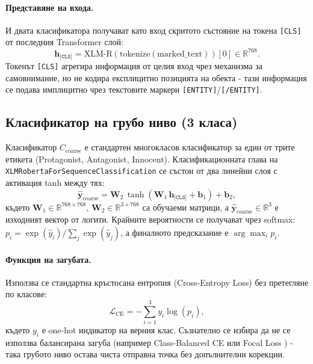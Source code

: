 \documentclass[12pt,a4paper]{report}
\begin{document}
\paragraph{Представяне на входа.} И двата класификатора получават като вход скритото състояние на токена \texttt{[CLS]} от последния Transformer слой:
\begin{equation}
  \mathbf{h}_{\texttt{[CLS]}} = \text{XLM-R}(\text{tokenize}(\text{marked\_text}))[0] \in \mathbb{R}^{768}.
\end{equation}
Токенът \texttt{[CLS]} агрегира информация от целия вход чрез механизма за самовнимание, но не кодира експлицитно позицията на обекта - тази информация се подава имплицитно чрез текстовите маркери \texttt{[ENTITY]}/\texttt{[/ENTITY]}.

\subsection{Класификатор на грубо ниво (3 класа)}

Класификатор $C_{\text{coarse}}$ е стандартен многокласов класификатор за един от трите етикета (Protagonist, Antagonist, Innocent). Класификационната глава на \texttt{XLMRobertaForSequenceClassification} се състои от два линейни слоя с активация tanh между тях:
\begin{equation}
  \hat{\mathbf{y}}_{\text{coarse}} = \mathbf{W}_2 \, \tanh(\mathbf{W}_1 \, \mathbf{h}_{\texttt{[CLS]}} + \mathbf{b}_1) + \mathbf{b}_2,
  \label{eq:classifier_head_coarse}
\end{equation}
където $\mathbf{W}_1 \in \mathbb{R}^{768 \times 768}$, $\mathbf{W}_2 \in \mathbb{R}^{3 \times 768}$ са обучаеми матрици, а $\hat{\mathbf{y}}_{\text{coarse}} \in \mathbb{R}^3$ е изходният вектор от логити. Крайните вероятности се получават чрез softmax: $p_i = \exp(\hat{y}_i) / \sum_j \exp(\hat{y}_j)$, а финалното предсказание е $\arg\max_i p_i$.

\paragraph{Функция на загубата.} Използва се стандартна кръстосана ентропия (Cross-Entropy Loss) без претегляне по класове:
\begin{equation}
  \mathcal{L}_{\text{CE}} = -\sum_{i=1}^{3} y_i \log(p_i),
  \label{eq:ce_loss}
\end{equation}
където $y_i$ е one-hot индикатор на верния клас. Съзнателно се избира да не се използва балансирана загуба (например Class-Balanced CE \cite{cui2019classbalanced} или Focal Loss \cite{lin2017focal}) - така грубото ниво остава чиста отправна точка без допълнителни корекции.
\end{document}
